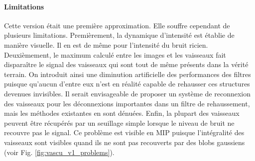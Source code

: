 \paragraph{Limitations} Cette version était une première approximation. Elle souffre cependant de plusieurs limitations. Premièrement, la dynamique d'intensité est établie de manière visuelle. Il en est de même pour l'intensité du bruit ricien. Deuxièmement, le maximum calculé entre les images et les vaisseaux fait disparaître le signal des vaisseaux qui sont tout de même présents dans la vérité terrain. On introduit ainsi une diminution artificielle des performances des filtres puisque qu'aucun d'entre eux n'est en réalité capable de rehausser ces structures devenues invisibles. Il serait envisageable de proposer un système de reconnexion des vaisseaux pour les déconnexions importantes dans un filtre de rehaussement, mais les méthodes existantes en sont dénuées. Enfin, la plupart des vaisseaux peuvent être récupérés par un seuillage simple lorsque le niveau de bruit ne recouvre pas le signal. Ce problème est visible en MIP puisque l'intégralité des vaisseaux sont visibles quand ils ne sont pas recouverts par des blobs gaussiens (voir Fig. \ref{fig:vascu_v1_problems}).
